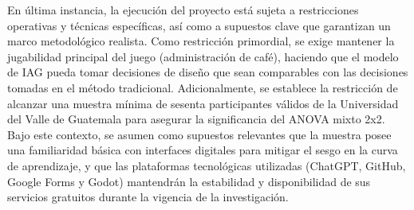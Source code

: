 En última instancia, la ejecución del proyecto está sujeta a restricciones operativas y técnicas específicas, así como a supuestos clave que garantizan un marco metodológico realista. Como restricción primordial, se exige mantener la jugabilidad principal del juego (administración de café), haciendo que el modelo de IAG pueda tomar decisiones de diseño que sean comparables con las decisiones tomadas en el método tradicional. Adicionalmente, se establece la restricción de alcanzar una muestra mínima de sesenta participantes válidos de la Universidad del Valle de Guatemala para asegurar la significancia del ANOVA mixto 2x2. Bajo este contexto, se asumen como supuestos relevantes que la muestra posee una familiaridad básica con interfaces digitales para mitigar el sesgo en la curva de aprendizaje, y que las plataformas tecnológicas utilizadas (ChatGPT, GitHub, Google Forms y Godot) mantendrán la estabilidad y disponibilidad de sus servicios gratuitos durante la vigencia de la investigación. 
